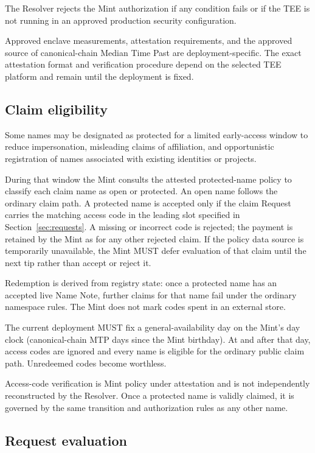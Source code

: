 The Resolver rejects the Mint authorization if any condition fails or if the TEE is not running in an approved production security configuration.

Approved enclave measurements, attestation requirements, and the approved source of canonical-chain Median Time Past are deployment-specific. The exact attestation format and verification procedure depend on the selected TEE platform and remain \openstatus{} until the deployment is fixed.

\subsection{Claim eligibility}

Some names may be designated as protected for a limited early-access window to reduce impersonation, misleading claims of affiliation, and opportunistic registration of names associated with existing identities or projects.

During that window the Mint consults the attested protected-name policy to classify each claim name as open or protected. An open name follows the ordinary claim path. A protected name is accepted only if the claim Request carries the matching access code in the leading slot specified in Section~\ref{sec:requests}. A missing or incorrect code is rejected; the payment is retained by the Mint as for any other rejected claim. If the policy data source is temporarily unavailable, the Mint MUST defer evaluation of that claim until the next tip rather than accept or reject it.

Redemption is derived from registry state: once a protected name has an accepted live Name Note, further claims for that name fail under the ordinary namespace rules. The Mint does not mark codes spent in an external store.

The current \zns{} deployment MUST fix a general-availability day on the Mint's day clock (canonical-chain MTP days since the Mint birthday). At and after that day, access codes are ignored and every name is eligible for the ordinary public claim path. Unredeemed codes become worthless.

Access-code verification is Mint policy under attestation and is not independently reconstructed by the Resolver. Once a protected name is validly claimed, it is governed by the same transition and authorization rules as any other name.

\subsection{Request evaluation}

